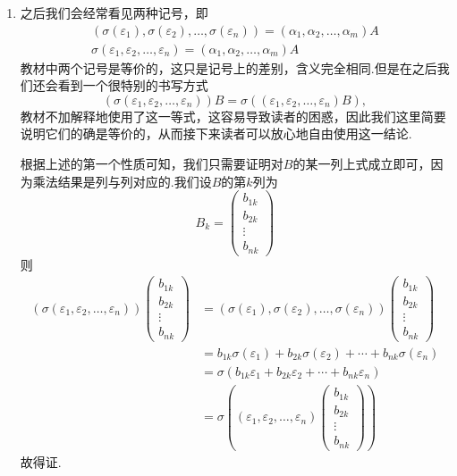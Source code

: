 \begin{enumerate}
    \item 之后我们会经常看见两种记号，即
    \begin{gather*}
        (\sigma(\varepsilon_1),\sigma(\varepsilon_2),\ldots,\sigma(\varepsilon_n))=(\alpha_1,\alpha_2,\ldots,\alpha_m)A \\
        \sigma(\varepsilon_1,\varepsilon_2,\ldots,\varepsilon_n)=(\alpha_1,\alpha_2,\ldots,\alpha_m)A
    \end{gather*}
    教材中两个记号是等价的，这只是记号上的差别，含义完全相同.但是在之后我们还会看到一个很特别的书写方式
    \[(\sigma(\varepsilon_1,\varepsilon_2,\ldots,\varepsilon_n))B=\sigma((\varepsilon_1,\varepsilon_2,\ldots,\varepsilon_n)B),\]
    教材不加解释地使用了这一等式，这容易导致读者的困惑，因此我们这里简要说明它们的确是等价的，从而接下来读者可以放心地自由使用这一结论.

    根据上述的第一个性质可知，我们只需要证明对$B$的某一列上式成立即可，因为乘法结果是列与列对应的.我们设$B$的第$k$列为
    \[B_k=\begin{pmatrix}
        b_{1k} \\ b_{2k} \\ \vdots \\ b_{nk}
    \end{pmatrix}\]
    则
    \begin{align*}
        (\sigma(\varepsilon_1,\varepsilon_2,\ldots,\varepsilon_n))\begin{pmatrix}
            b_{1k} \\ b_{2k} \\ \vdots \\ b_{nk}
        \end{pmatrix}&=(\sigma(\varepsilon_1),\sigma(\varepsilon_2),\ldots,\sigma(\varepsilon_n))\begin{pmatrix}
            b_{1k} \\ b_{2k} \\ \vdots \\ b_{nk}
        \end{pmatrix}\\&=b_{1k}\sigma(\varepsilon_1)+b_{2k}\sigma(\varepsilon_2)+\cdots+b_{nk}\sigma(\varepsilon_n)
        \\&=\sigma(b_{1k}\varepsilon_1+b_{2k}\varepsilon_2+\cdots+b_{nk}\varepsilon_n)
        \\&=\sigma((\varepsilon_1,\varepsilon_2,\ldots,\varepsilon_n)\begin{pmatrix}
            b_{1k} \\ b_{2k} \\ \vdots \\ b_{nk}
        \end{pmatrix})
    \end{align*}
    故得证.
\end{enumerate}

